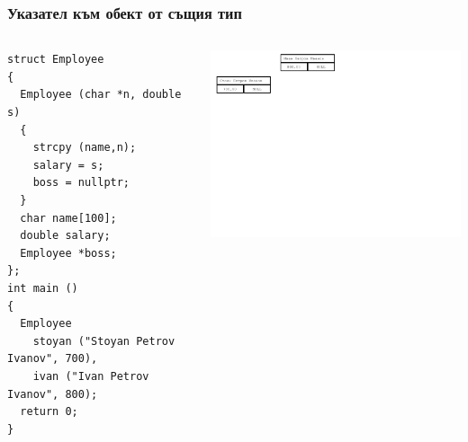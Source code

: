 \documentclass{beamer}
\begin{document}
\begin{frame}[fragile]
\frametitle{Указател към обект от същия тип}

\begin{columns}[c]
  \begin{column}{0.55\textwidth}
\begin{flushleft}
\begin{lstlisting}
struct Employee
{
  Employee (char *n, double s)
  {
    strcpy (name,n);
    salary = s;
    boss = nullptr;
  }
  char name[100];
  double salary;
  Employee *boss;
};
int main ()
{
  Employee 
    stoyan ("Stoyan Petrov Ivanov", 700),
    ivan ("Ivan Petrov Ivanov", 800);
  return 0;
}

\end{lstlisting}  
\end{flushleft}

  \end{column}
  \begin{column}{0.45\textwidth}
\hspace{-100px}
\includegraphics[width=10.5cm]{images/00_rec_obj_two_objects_unlinked}

  \end{column}
\end{columns}
\end{frame}
\end{document}
